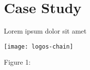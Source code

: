 \section{Case Study}
Lorem ipsum dolor sit amet \cite{PBAC}

\begin{center}
	\texttt{[image: logos-chain]}
\end{center}
\begin{center}
	Figure 1: 
\end{center}